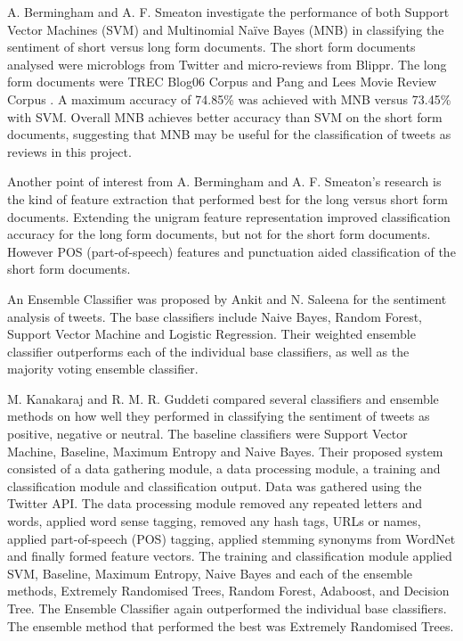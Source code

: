 A. Bermingham and A. F. Smeaton \cite{Berm2010} investigate the performance of both Support Vector Machines (SVM) and Multinomial Naïve Bayes (MNB) in classifying the sentiment of short versus long form documents. The short form documents analysed were microblogs from Twitter and micro-reviews from Blippr. The long form documents were TREC Blog06 Corpus and Pang and Lees Movie Review Corpus \cite{panglee2004}. A maximum accuracy of 74.85\% was achieved with MNB versus 73.45\% with SVM. Overall MNB achieves better accuracy than SVM on the short form documents, suggesting that MNB may be useful for the classification of tweets as reviews in this project.

Another point of interest from A. Bermingham and A. F. Smeaton's research is the kind of feature extraction that performed best for the long versus short form documents. Extending the unigram feature representation improved classification accuracy for the long form documents, but not for the short form documents. However POS (part-of-speech) features and punctuation aided classification of the short form documents. 

An Ensemble Classifier was proposed by Ankit and N. Saleena \cite{Ankit2018} for the sentiment analysis of tweets. The base classifiers include Naive Bayes, Random Forest, Support Vector Machine and Logistic Regression. Their weighted ensemble classifier outperforms each of the individual base classifiers, as well as the majority voting ensemble classifier.

M. Kanakaraj and R. M. R. Guddeti \cite{Kanakaraj2015} compared several classifiers and ensemble methods on how well they performed in classifying the sentiment of tweets as positive, negative or neutral. The baseline classifiers were Support Vector Machine, Baseline, Maximum Entropy and Naive Bayes. Their proposed system consisted of a data gathering module, a data processing module, a training and classification module and classification output. Data was gathered using the Twitter API. The data processing module removed any repeated letters and words, applied word sense tagging, removed any hash tags, URLs or names, applied part-of-speech (POS) tagging, applied stemming synonyms from WordNet and finally formed feature vectors. The training and classification module applied SVM, Baseline, Maximum Entropy, Naive Bayes and each of the ensemble methods, Extremely Randomised Trees, Random Forest, Adaboost, and Decision Tree. The Ensemble Classifier again outperformed the individual base classifiers. The ensemble method that performed the best was Extremely Randomised Trees. 

